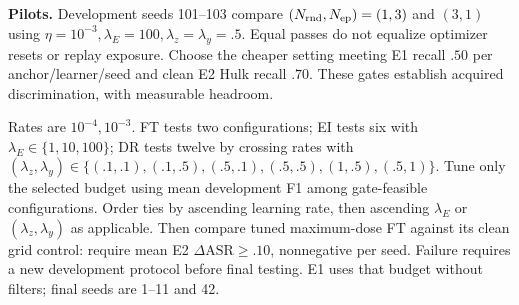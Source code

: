 \documentclass[10pt,a4paper]{article}
\begin{document}
\textbf{Pilots.} Development seeds 101--103 compare $(N_{\rm rnd},N_{\rm ep})=(1,3)$ and $(3,1)$ using $\eta=10^{-3},\lambda_E=100,\lambda_z=\lambda_y=.5$. Equal passes do not equalize optimizer resets or replay exposure. Choose the cheaper setting meeting E1 recall $.50$ per anchor/learner/seed and clean E2 Hulk recall $.70$. These gates establish acquired discrimination, with measurable headroom.

Rates are $10^{-4},10^{-3}$. FT tests two configurations; EI tests six with $\lambda_E\in\{1,10,100\}$; DR tests twelve by crossing rates with $(\lambda_z,\lambda_y)\in\{(.1,.1),(.1,.5),(.5,.1),(.5,.5),(1,.5),(.5,1)\}$. Tune only the selected budget using mean development F1 among gate-feasible configurations. Order ties by ascending learning rate, then ascending $\lambda_E$ or $(\lambda_z,\lambda_y)$ as applicable. Then compare tuned maximum-dose FT against its clean grid control: require mean E2 $\Delta\mathrm{ASR}\ge.10$, nonnegative per seed. Failure requires a new development protocol before final testing. E1 uses that budget without filters; final seeds are 1--11 and 42.
\end{document}
